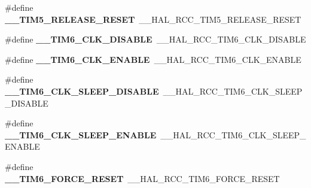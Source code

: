 \begin{DoxyCompactItemize}
\item 
\hypertarget{group___h_a_l___r_c_c___aliased_ga9147d36f3775a32d40f0abcf2fd38fef}{\#define {\bfseries \-\_\-\-\_\-\-T\-I\-M5\-\_\-\-R\-E\-L\-E\-A\-S\-E\-\_\-\-R\-E\-S\-E\-T}~\-\_\-\-\_\-\-H\-A\-L\-\_\-\-R\-C\-C\-\_\-\-T\-I\-M5\-\_\-\-R\-E\-L\-E\-A\-S\-E\-\_\-\-R\-E\-S\-E\-T}\label{group___h_a_l___r_c_c___aliased_ga9147d36f3775a32d40f0abcf2fd38fef}

\item 
\hypertarget{group___h_a_l___r_c_c___aliased_ga16facf74d71ea54b2a9da63cffe0c99a}{\#define {\bfseries \-\_\-\-\_\-\-T\-I\-M6\-\_\-\-C\-L\-K\-\_\-\-D\-I\-S\-A\-B\-L\-E}~\-\_\-\-\_\-\-H\-A\-L\-\_\-\-R\-C\-C\-\_\-\-T\-I\-M6\-\_\-\-C\-L\-K\-\_\-\-D\-I\-S\-A\-B\-L\-E}\label{group___h_a_l___r_c_c___aliased_ga16facf74d71ea54b2a9da63cffe0c99a}

\item 
\hypertarget{group___h_a_l___r_c_c___aliased_gaa4a746941c7432e4c3cbf7530cbd0b36}{\#define {\bfseries \-\_\-\-\_\-\-T\-I\-M6\-\_\-\-C\-L\-K\-\_\-\-E\-N\-A\-B\-L\-E}~\-\_\-\-\_\-\-H\-A\-L\-\_\-\-R\-C\-C\-\_\-\-T\-I\-M6\-\_\-\-C\-L\-K\-\_\-\-E\-N\-A\-B\-L\-E}\label{group___h_a_l___r_c_c___aliased_gaa4a746941c7432e4c3cbf7530cbd0b36}

\item 
\hypertarget{group___h_a_l___r_c_c___aliased_ga03bbe3efed06a8df35996cb58c890af4}{\#define {\bfseries \-\_\-\-\_\-\-T\-I\-M6\-\_\-\-C\-L\-K\-\_\-\-S\-L\-E\-E\-P\-\_\-\-D\-I\-S\-A\-B\-L\-E}~\-\_\-\-\_\-\-H\-A\-L\-\_\-\-R\-C\-C\-\_\-\-T\-I\-M6\-\_\-\-C\-L\-K\-\_\-\-S\-L\-E\-E\-P\-\_\-\-D\-I\-S\-A\-B\-L\-E}\label{group___h_a_l___r_c_c___aliased_ga03bbe3efed06a8df35996cb58c890af4}

\item 
\hypertarget{group___h_a_l___r_c_c___aliased_ga0dd96378a8b3691ff2f29d93e80f4291}{\#define {\bfseries \-\_\-\-\_\-\-T\-I\-M6\-\_\-\-C\-L\-K\-\_\-\-S\-L\-E\-E\-P\-\_\-\-E\-N\-A\-B\-L\-E}~\-\_\-\-\_\-\-H\-A\-L\-\_\-\-R\-C\-C\-\_\-\-T\-I\-M6\-\_\-\-C\-L\-K\-\_\-\-S\-L\-E\-E\-P\-\_\-\-E\-N\-A\-B\-L\-E}\label{group___h_a_l___r_c_c___aliased_ga0dd96378a8b3691ff2f29d93e80f4291}

\item 
\hypertarget{group___h_a_l___r_c_c___aliased_ga24edb732ed2e5e6ac7724695b5f21954}{\#define {\bfseries \-\_\-\-\_\-\-T\-I\-M6\-\_\-\-F\-O\-R\-C\-E\-\_\-\-R\-E\-S\-E\-T}~\-\_\-\-\_\-\-H\-A\-L\-\_\-\-R\-C\-C\-\_\-\-T\-I\-M6\-\_\-\-F\-O\-R\-C\-E\-\_\-\-R\-E\-S\-E\-T}\label{group___h_a_l___r_c_c___aliased_ga24edb732ed2e5e6ac7724695b5f21954}


\end{DoxyCompactItemize}

